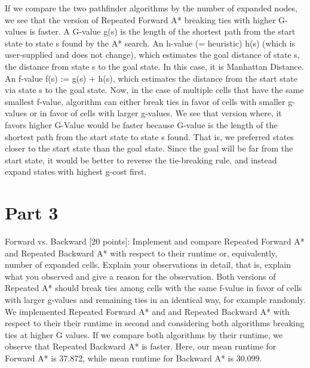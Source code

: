 \documentclass[preprint,12pt,3p]{elsarticle}
\begin{document}
If we compare the two pathfinder algorithms by the number of expanded nodes, we see that the version of Repeated Forward A* breaking ties with higher G-values is faster. A G-value g(s)  is the length of the shortest path from the start state to state s found by the A* search. An h-value (= heuristic) h(s) (which is user-supplied and does not change), which estimates the goal distance of state s, the distance from state s to the goal state. In this case, it is Manhattan Distance. An f-value f(s) := g(s) + h(s), which estimates the distance from the start state via state s to the goal state. Now, in the case of multiple cells that have the same smallest f-value, algorithm can either break ties in favor of cells with smaller g-values or in favor of cells with larger g-values. We see that version where, it favors higher G-Value would be faster because G-value is the length of the shortest path from the start state to state s found. That is, we preferred states closer to the start state than the goal state. Since the goal will be far from the start state, it would be better to reverse the tie-breaking rule, and instead expand states with highest g-cost first.


\section{Part 3}
\label{sec3}

Forward vs. Backward [20 points]: Implement and compare Repeated Forward A* and Repeated Backward A* with respect to their runtime or, equivalently, number of expanded cells. Explain your observations in detail, that is, explain what you observed and give a reason for the observation. Both versions of Repeated A* should break ties among cells with the same f-value in favor of cells with larger g-values and remaining ties in an identical way, for example randomly.\\

We implemented Repeated Forward A* and and Repeated Backward A* with respect to their their runtime in second and considering both algorithms breaking ties at higher G values. If we compare both algorithms by their runtime, we observe that Repeated Backward A* is faster. Here, our mean runtime for Forward A* is 37.872, while mean runtime for Backward A* is 30.099. 
\end{document}
